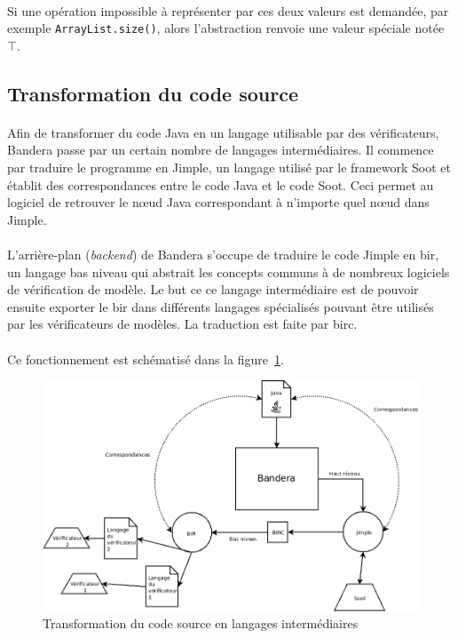 \paragraph{}
Si une opération impossible à représenter par ces deux valeurs est
demandée, par exemple \verb|ArrayList.size()|, alors l'abstraction
renvoie une valeur spéciale notée $\top$.

\subsection{Transformation du code source}
\label{sec:bandera_source}

\paragraph{}
Afin de transformer du code Java en un langage utilisable par des
vérificateurs, Bandera passe par un certain nombre de langages
intermédiaires. Il commence par traduire le programme en Jimple, un
langage utilisé par le framework Soot et établit des correspondances
entre le code Java et le code Soot. Ceci permet au logiciel de
retrouver le n\oe{}ud Java correspondant à n'importe quel n\oe{}ud
dans Jimple.

\paragraph{}
L'arrière-plan (\textit{backend}) de Bandera s'occupe de traduire le
code Jimple en \gls{bir}, un langage bas niveau qui abstrait les
concepts communs à de nombreux logiciels de vérification de modèle. Le
but ce ce langage intermédiaire est de pouvoir ensuite exporter le
\gls{bir} dans différents langages spécialisés pouvant être utilisés
par les vérificateurs de modèles. La traduction est faite par
\gls{birc}.

\paragraph{}
Ce fonctionnement est schématisé dans la figure~\ref{fig:bir_jimple}.

\begin{figure}[H]
  \centering
  \includegraphics[scale=0.5]{images/bandera_bir_jimple.png}
  \caption{\label{fig:bir_jimple} Transformation du code source en
    langages intermédiaires}
\end{figure}

